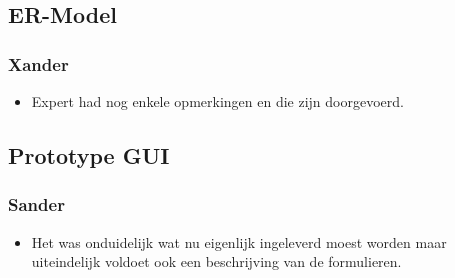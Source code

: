 
\subsection*{ER-Model}
\subsubsection*{Xander}
\begin{itemize}
\item Expert had nog enkele opmerkingen en die zijn doorgevoerd.
\end{itemize}

\subsection*{Prototype GUI}
\subsubsection*{Sander}
\begin{itemize}
\item Het was onduidelijk wat nu eigenlijk ingeleverd moest worden
maar uiteindelijk voldoet ook een beschrijving van de formulieren.
\end{itemize}

